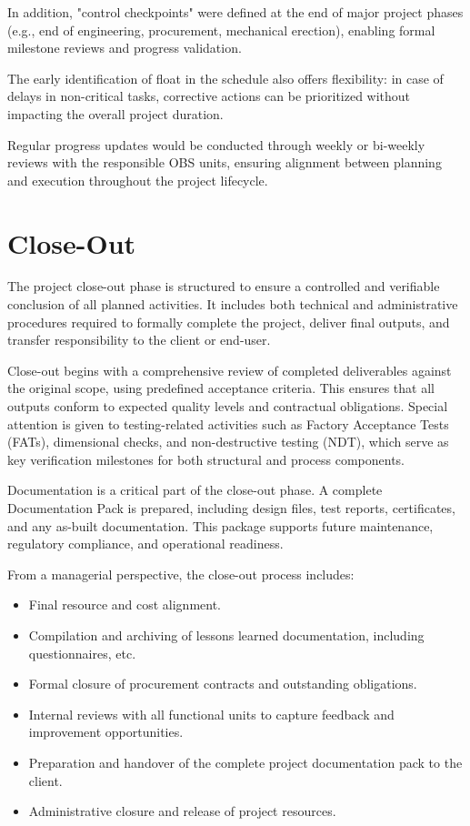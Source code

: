 \documentclass[12pt]{article}
\begin{document}
In addition, "control checkpoints" were defined at the end of major project phases (e.g., end of engineering, procurement, mechanical erection), enabling formal milestone reviews and progress validation.

The early identification of float in the schedule also offers flexibility: in case of delays in non-critical tasks, corrective actions can be prioritized without impacting the overall project duration.

Regular progress updates would be conducted through weekly or bi-weekly reviews with the responsible OBS units, ensuring alignment between planning and execution throughout the project lifecycle.

\section{Close-Out}

The project close-out phase is structured to ensure a controlled and verifiable conclusion of all planned activities. It includes both technical and administrative procedures required to formally complete the project, deliver final outputs, and transfer responsibility to the client or end-user.

Close-out begins with a comprehensive review of completed deliverables against the original scope, using predefined acceptance criteria. This ensures that all outputs conform to expected quality levels and contractual obligations. Special attention is given to testing-related activities such as Factory Acceptance Tests (FATs), dimensional checks, and non-destructive testing (NDT), which serve as key verification milestones for both structural and process components.

Documentation is a critical part of the close-out phase. A complete Documentation Pack is prepared, including design files, test reports, certificates, and any as-built documentation. This package supports future maintenance, regulatory compliance, and operational readiness.

From a managerial perspective, the close-out process includes:
\begin{itemize}
        \item Final resource and cost alignment.
        \item Compilation and archiving of lessons learned documentation, including questionnaires, etc.
        \item Formal closure of procurement contracts and outstanding obligations.
        \item Internal reviews with all functional units to capture feedback and improvement opportunities.
        \item Preparation and handover of the complete project documentation pack to the client.
        \item Administrative closure and release of project resources.
\end{itemize}
\end{document}
